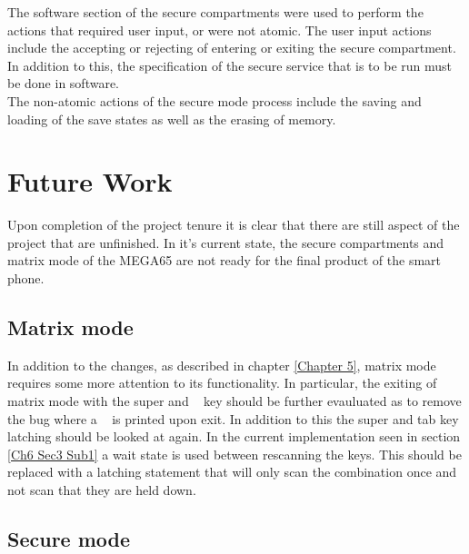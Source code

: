 The software section of the secure compartments were used to perform the actions that required user input, or were not atomic. The user input actions include the accepting or rejecting of entering or exiting the secure compartment. In addition to this, the specification of the secure service that is to be run must be done in software.\\
The non-atomic actions of the secure mode process include the saving and loading of the save states as well as the erasing of memory.
\\


\section{Future Work}

\label{Ch7 Sec4}

Upon completion of the project tenure it is clear that there are still aspect of the project that are unfinished. In it's current state, the secure compartments and matrix mode of the MEGA65 are not ready for the final product of the smart phone.

\subsection{Matrix mode}

\label{Ch7 Sec4 Sub1}

In addition to the changes, as described in chapter \ref{Chapter 5}, matrix mode requires some more attention to its functionality. In particular, the exiting of matrix mode with the super and ~ key should be further evauluated as to remove the bug where a ~ is printed upon exit. In addition to this the super and tab key latching should be looked at again. In the current implementation seen in section \ref{Ch6 Sec3 Sub1} a wait state is used between rescanning the keys. This should be replaced with a latching statement that will only scan the combination once and not scan that they are held down.

\subsection{Secure mode}

\label{Ch7 Sec4 Sub2}


